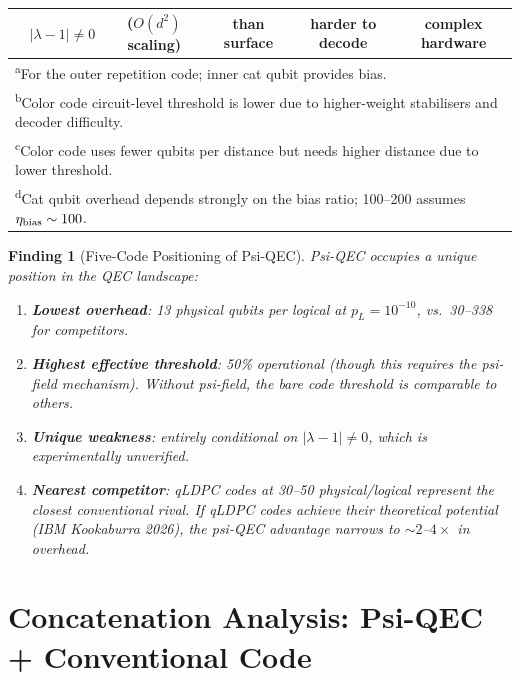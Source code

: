 \documentclass[11pt]{article}
\newtheorem{finding}[theorem]{Finding}
\theoremstyle{definition}
\theoremstyle{remark}
\newcommand{\lamdiff}{|\lambda-1|}
\begin{document}
\begin{table}[ht]
\begin{tabular}{@{}p{2.6cm}ccccc@{}}
 & $\lamdiff \neq 0$ & ($O(d^2)$ scaling) & than surface
  & harder to decode & complex hardware \\
\bottomrule
\multicolumn{6}{l}{\textsuperscript{a}For the outer repetition code;
  inner cat qubit provides bias.} \\
\multicolumn{6}{l}{\textsuperscript{b}Color code circuit-level threshold
  is lower due to higher-weight stabilisers and decoder difficulty.} \\
\multicolumn{6}{l}{\textsuperscript{c}Color code uses fewer qubits per
  distance but needs higher distance due to lower threshold.} \\
\multicolumn{6}{l}{\textsuperscript{d}Cat qubit overhead depends strongly
  on the bias ratio; 100--200 assumes $\eta_{\rm bias} \sim 100$.}
\end{tabular}
\end{table}

\begin{finding}[Five-Code Positioning of Psi-QEC]
\label{finding:five-code-position}
Psi-QEC occupies a unique position in the QEC landscape:
\begin{enumerate}[nosep]
  \item \textbf{Lowest overhead}: 13 physical qubits per logical at
    $p_L = 10^{-10}$, vs.\ 30--338 for competitors.
  \item \textbf{Highest effective threshold}: 50\% operational (though
    this requires the psi-field mechanism).  Without psi-field, the bare
    code threshold is comparable to others.
  \item \textbf{Unique weakness}: \emph{entirely conditional} on
    $\lamdiff \neq 0$, which is experimentally unverified.
  \item \textbf{Nearest competitor}: qLDPC codes at 30--50 physical/logical
    represent the closest conventional rival.  If qLDPC codes achieve
    their theoretical potential (IBM Kookaburra 2026), the psi-QEC
    advantage narrows to $\sim 2$--$4\times$ in overhead.
\end{enumerate}
\end{finding}

\section{Concatenation Analysis: Psi-QEC + Conventional Code}
\label{sec:concatenation}
\end{document}
